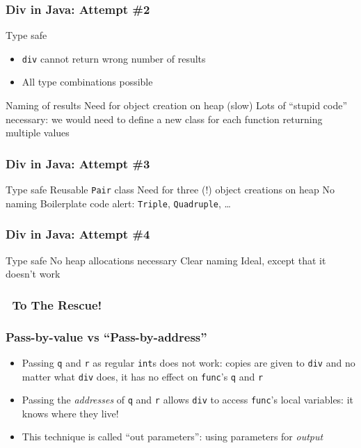 \begin{frame}
  \frametitle{Div in Java: Attempt \#2}
  \begin{procontralist}
    \pro Type safe
         \begin{itemize}
           \item \texttt{div} cannot return wrong number of results
           \item All type combinations possible
         \end{itemize}
    \pro Naming of results
    \con Need for object creation on heap (slow)
    \con Lots of ``stupid code'' necessary: we would need to define a new class for each function returning multiple values
  \end{procontralist}
\end{frame}

\begin{frame}
  \frametitle{Div in Java: Attempt \#3}
  \begin{procontralist}
    \pro Type safe
    \pro Reusable {\tt Pair} class
    \con Need for three (!) object creations on heap
    \con No naming
    \con Boilerplate code alert: {\tt Triple}, {\tt Quadruple}, \dots
  \end{procontralist}
\end{frame}

\begin{frame}
  \frametitle{Div in Java: Attempt \#4}
  \begin{procontralist}
    \pro Type safe
    \pro No heap allocations necessary
    \pro Clear naming
    \con Ideal, except that it doesn't work \frownie
  \end{procontralist}
\end{frame}

\begin{frame}
  \frametitle{\cpp\ To The Rescue!}
\end{frame}

\begin{frame}
  \frametitle{Pass-by-value vs ``Pass-by-address''}
  \begin{itemize}
    \item Passing \texttt{q} and \texttt{r} as regular \texttt{int}s does not work:
          copies are given to \texttt{div} and no matter what \texttt{div} does,
          it has no effect on \texttt{func}'s \texttt{q} and \texttt{r}
    \item Passing the \emph{addresses} of \texttt{q} and \texttt{r} allows \texttt{div} to access \texttt{func}'s local
          variables: it knows where they live!
    \item This technique is called ``out parameters'': using parameters for \emph{output}
  \end{itemize}
\end{frame}

